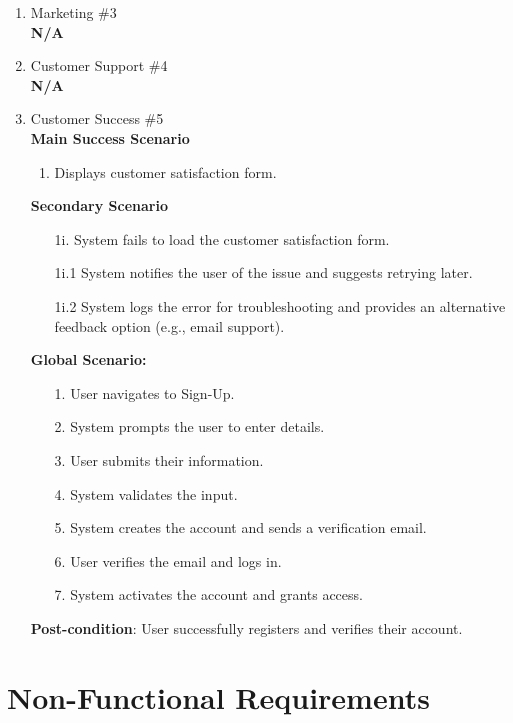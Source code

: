 \documentclass{article}
\begin{document}
\begin{enumerate}[{\bf BE1.}]
\begin{enumerate}[{\bf VP1.}]
 \item Marketing \#3 \\
	\textbf{N/A}

\item Customer Support \#4 \\
	\textbf{N/A}  

\item Customer Success \#5 \\
    \textbf{Main Success Scenario}
    \begin{enumerate}
		\item Displays customer satisfaction form.
    \end{enumerate}
    \textbf{Secondary Scenario}
   \begin{enumerate}
		\item[1i.] System fails to load the customer satisfaction form.
            \item[1i.1] System notifies the user of the issue and suggests retrying later.
            \item[1i.2] System logs the error for troubleshooting and provides an alternative feedback option (e.g., email support).
    \end{enumerate} 
	\textbf{Global Scenario:}

	\begin{enumerate}
		\item[1.] User navigates to Sign-Up.
		\item[2.] System prompts the user to enter details.
		\item[3.] User submits their information.
		\item[4.] System validates the input.
		\item[5.] System creates the account and sends a verification email.
		\item[6.] User verifies the email and logs in.
		\item[7.] System activates the account and grants access.
	\end{enumerate}

	\textbf{Post-condition}:  User successfully registers and verifies their account.



\end{enumerate}

\end{enumerate}

\section{Non-Functional Requirements}
\label{sec:non-functional_requirements}
\end{document}
